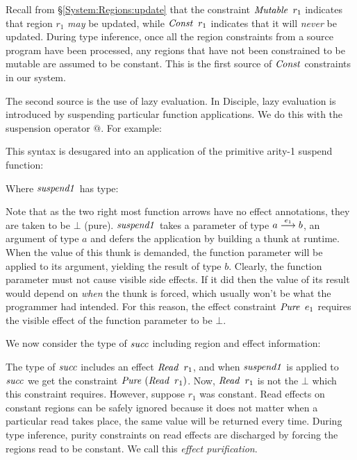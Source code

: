 Recall from \S\ref{System:Regions:update} that the constraint $\operatorname{\mathit{Mutable}} \ r_1$ indicates that region $r_1$ \emph{may} be updated, while $\iConst \ r_1$ indicates that it will \emph{never} be updated. During type inference, once all the region constraints from a source program have been processed, any regions that have not been constrained to be mutable are assumed to be constant. This is the first source of $\operatorname{\mathit{Const}}$ constraints in our system.

The second source is the use of lazy evaluation. In Disciple, lazy evaluation is introduced by suspending particular function applications. We do this with the suspension operator $@$. For example:


This syntax is desugared into an application of the primitive arity-1 suspend function:


Where $\operatorname{\mathit{suspend1}}$ has type:


Note that as the two right most function arrows have no effect annotations, they are taken to be $\bot$ (pure). $\operatorname{\mathit{suspend1}}$ takes a parameter of type $a \stackrel{e_1}{\longrightarrow} b$, an argument of type $a$ and defers the application by building a thunk at runtime. When the value of this thunk is demanded, the function parameter will be applied to its argument, yielding the result of type $b$. Clearly, the function parameter must not cause visible side effects. If it did then the value of its result would depend on \emph{when} the thunk is forced, which usually won't be what the programmer had intended. For this reason, the effect constraint $\operatorname{\mathit{Pure}} \ e_1$ requires the visible effect of the function parameter to be $\bot$.

We now consider the type of $\operatorname{\mathit{succ}}$ including region and effect information:


The type of $\operatorname{\mathit{succ}}$ includes an effect $\operatorname{\mathit{Read}} \ r_1$, and when $\operatorname{\mathit{suspend1}}$ is applied to $\operatorname{\mathit{succ}}$ we get the constraint $\operatorname{\mathit{Pure}} \ (\operatorname{\mathit{Read}} \ r_1)$. Now, $\operatorname{\mathit{Read}} \ r_1$ is not the $\bot$ which this constraint requires. However, suppose $r_1$ was constant. Read effects on constant regions can be safely ignored because it does not matter when a particular read takes place, the same value will be returned every time. During type inference, purity constraints on read effects are discharged by forcing the regions read to be constant. We call this \emph{effect purification}. 


